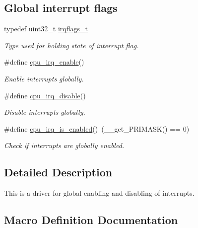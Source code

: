 \subsection*{Global interrupt flags}
\begin{DoxyCompactItemize}
\item 
\hypertarget{group__interrupt__group_ga9aa1f52defc97531b6343233abeea613}{}typedef uint32\+\_\+t \hyperlink{group__interrupt__group_ga9aa1f52defc97531b6343233abeea613}{irqflags\+\_\+t}\label{group__interrupt__group_ga9aa1f52defc97531b6343233abeea613}

\begin{DoxyCompactList}\small\item\em Type used for holding state of interrupt flag. \end{DoxyCompactList}\item 
\#define \hyperlink{group__interrupt__group_gae4922a4bd8ba4150211fbc7f2302403c}{cpu\+\_\+irq\+\_\+enable}()
\begin{DoxyCompactList}\small\item\em Enable interrupts globally. \end{DoxyCompactList}\item 
\#define \hyperlink{group__interrupt__group_ga7b77391ed86e2e027f9ee1dd99a06980}{cpu\+\_\+irq\+\_\+disable}()
\begin{DoxyCompactList}\small\item\em Disable interrupts globally. \end{DoxyCompactList}\item 
\#define \hyperlink{group__interrupt__group_gae1545a2473614564550b9c4015c94978}{cpu\+\_\+irq\+\_\+is\+\_\+enabled}()~(\+\_\+\+\_\+get\+\_\+\+P\+R\+I\+M\+A\+S\+K() == 0)
\begin{DoxyCompactList}\small\item\em Check if interrupts are globally enabled. \end{DoxyCompactList}\end{DoxyCompactItemize}


\subsection{Detailed Description}
This is a driver for global enabling and disabling of interrupts. 

\subsection{Macro Definition Documentation}
\hypertarget{group__interrupt__group_ga7b77391ed86e2e027f9ee1dd99a06980}{}
